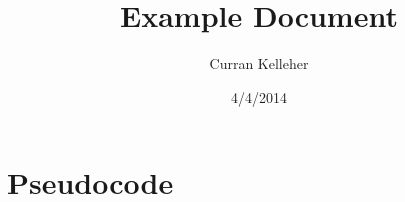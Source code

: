 \documentclass[12pt]{article}
\title{Example Document}
\author{Curran Kelleher}
\date{4/4/2014}
\begin{document}
\maketitle 
\section{Pseudocode}

\end{document}
